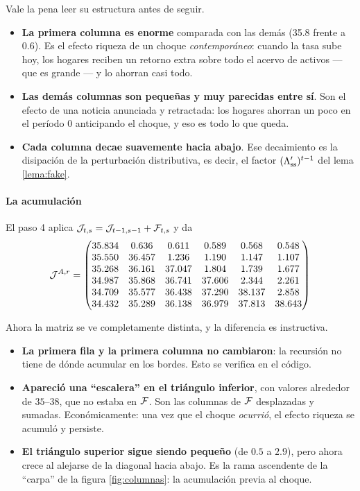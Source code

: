 Vale la pena leer su estructura antes de seguir.

\begin{itemize}[leftmargin=1.4em]
\item \textbf{La primera columna es enorme} comparada con las demás (35.8 frente
a 0.6). Es el efecto riqueza de un choque \emph{contemporáneo}: cuando la tasa
sube hoy, los hogares reciben un retorno extra sobre todo el acervo de activos
--- que es grande --- y lo ahorran casi todo.
\item \textbf{Las demás columnas son pequeñas y muy parecidas entre sí}. Son el
efecto de una noticia anunciada y retractada: los hogares ahorran un poco en el
período 0 anticipando el choque, y eso es todo lo que queda.
\item \textbf{Cada columna decae suavemente hacia abajo}. Ese decaimiento es la
disipación de la perturbación distributiva, es decir, el factor
$(\Lambda_{\mathrm{ss}}')^{t-1}$ del lema \ref{lema:fake}.
\end{itemize}

\paragraph{La acumulación} El paso 4 aplica $\mathcal{J}_{t,s}=\mathcal{J}_{t-1,s-1}+\mathcal{F}_{t,s}$ y da
\begin{equation}
\mathcal{J}^{A,r} =
\begin{pmatrix}
35.834 & 0.636 & 0.611 & 0.589 & 0.568 & 0.548 \\
35.550 & 36.457 & 1.236 & 1.190 & 1.147 & 1.107 \\
35.268 & 36.161 & 37.047 & 1.804 & 1.739 & 1.677 \\
34.987 & 35.868 & 36.741 & 37.606 & 2.344 & 2.261 \\
34.709 & 35.577 & 36.438 & 37.290 & 38.137 & 2.858 \\
34.432 & 35.289 & 36.138 & 36.979 & 37.813 & 38.643
\end{pmatrix}
\end{equation}

Ahora la matriz se ve completamente distinta, y la diferencia es instructiva.

\begin{itemize}[leftmargin=1.4em]
\item \textbf{La primera fila y la primera columna no cambiaron}: la recursión no
tiene de dónde acumular en los bordes. Esto se verifica en el código.
\item \textbf{Apareció una ``escalera'' en el triángulo inferior}, con valores
alrededor de $35$--$38$, que no estaba en $\mathcal{F}$. Son las columnas de $\mathcal{F}$
desplazadas y sumadas. Económicamente: una vez que el choque \emph{ocurrió}, el
efecto riqueza se acumuló y persiste.
\item \textbf{El triángulo superior sigue siendo pequeño} (de $0.5$ a $2.9$),
pero ahora crece al alejarse de la diagonal hacia abajo. Es la rama ascendente de
la ``carpa'' de la figura \ref{fig:columnas}: la acumulación previa al choque.
\end{itemize}

